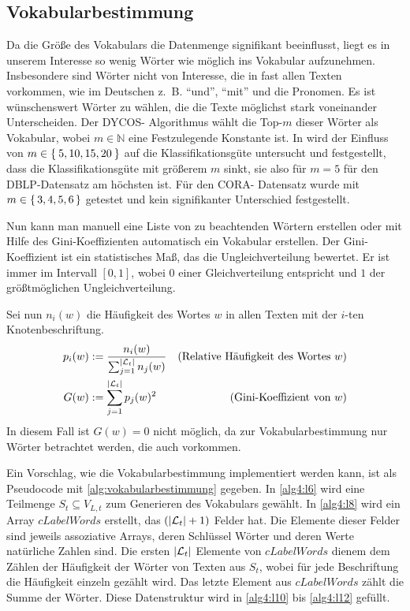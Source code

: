 \subsection{Vokabularbestimmung}\label{sec:vokabularbestimmung}
Da die Größe des Vokabulars die Datenmenge signifikant beeinflusst,
liegt es in unserem Interesse so wenig Wörter wie möglich ins
Vokabular aufzunehmen. Insbesondere sind Wörter nicht von Interesse,
die in fast allen Texten vorkommen, wie im Deutschen z.~B.
\enquote{und}, \enquote{mit} und die Pronomen. Es ist wünschenswert Wörter zu
wählen, die die Texte möglichst stark voneinander Unterscheiden. Der DYCOS-
Algorithmus wählt die Top-$m$ dieser Wörter als Vokabular, wobei $m \in
\mathbb{N}$ eine Festzulegende Konstante ist. In \cite[S. 365]{aggarwal2011}
wird der Einfluss von $m \in \Set{5,10, 15,20}$ auf die Klassifikationsgüte
untersucht und festgestellt, dass die Klassifikationsgüte mit größerem $m$
sinkt, sie also für $m=5$ für den DBLP-Datensatz am höchsten ist. Für den CORA-
Datensatz wurde mit $m \in \set{3,4,5,6}$ getestet und kein signifikanter
Unterschied festgestellt.

Nun kann man manuell eine Liste von zu beachtenden Wörtern erstellen
oder mit Hilfe des Gini-Koeffizienten automatisch ein Vokabular erstellen.
Der Gini-Koeffizient ist ein statistisches Maß, das die Ungleichverteilung
bewertet. Er ist immer im Intervall $[0,1]$, wobei $0$ einer
Gleichverteilung entspricht und $1$ der größtmöglichen Ungleichverteilung.

Sei nun $n_i(w)$ die Häufigkeit des Wortes $w$ in allen Texten mit der $i$-ten
Knotenbeschriftung.
\begin{align}
    p_i(w) &:= \frac{n_i(w)}{\sum_{j=1}^{|\mathcal{L}_t|} n_j(w)} &\text{(Relative Häufigkeit des Wortes $w$)}\\
    G(w)   &:= \sum_{j=1}^{|\mathcal{L}_t|} p_j(w)^2              &\text{(Gini-Koeffizient von $w$)}
\end{align}
In diesem Fall ist $G(w)=0$ nicht möglich, da zur Vokabularbestimmung nur
Wörter betrachtet werden, die auch vorkommen.

Ein Vorschlag, wie die Vokabularbestimmung implementiert werden kann, ist als
Pseudocode mit \cref{alg:vokabularbestimmung} gegeben. In \cref{alg4:l6} wird
eine Teilmenge $S_t \subseteq V_{L,t}$ zum Generieren des Vokabulars gewählt.
In \cref{alg4:l8} wird ein Array $cLabelWords$ erstellt, das $(|\mathcal{L}_t|+1)$
Felder hat. Die Elemente dieser Felder sind jeweils assoziative Arrays, deren
Schlüssel Wörter und deren Werte natürliche Zahlen sind. Die ersten $|\mathcal{L}_t|$
Elemente von $cLabelWords$ dienem dem Zählen der Häufigkeit der Wörter von
Texten aus $S_t$, wobei für jede Beschriftung die Häufigkeit einzeln gezählt
wird. Das letzte Element aus $cLabelWords$ zählt die Summe der Wörter. Diese
Datenstruktur wird in \cref{alg4:l10} bis \ref{alg4:l12} gefüllt.

